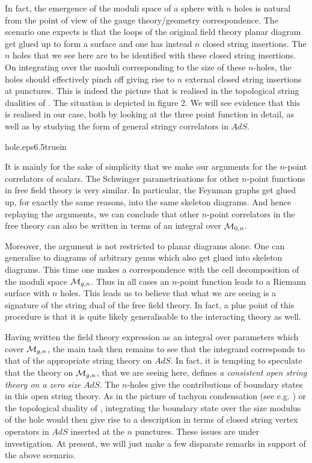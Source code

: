 In fact, the emergence of the moduli space of a sphere with $n$
holes is natural from the point of view of the gauge
theory/geometry correspondence. The scenario one expects is that
the loops of the original field theory planar diagram get glued up
to form a surface and one has instead $n$ closed string
insertions. The $n$ holes that we see here are to be identified
with these closed string insertions. On integrating over the
moduli corresponding to the size of these $n$-holes, the holes
should effectively pinch off giving rise to $n$ external closed
string insertions at punctures. This is indeed the picture that is
realised in the topological string dualities of \gv\ov\gr . The
situation is depicted in figure 2. We will see evidence that this is 
realised in our case, both by looking at the three point 
function in detail, as well as by studying the form of general 
stringy correlators in $AdS$. 


%
{hole.eps}{6.5truein}
%

It is mainly for the sake of simplicity that we make our arguments 
for the $n$-point correlators of scalars. 
The Schwinger parametrisations for other $n$-point functions in
free field theory is very similar. In particular, the Feynman
graphs get glued up, for exactly the same reasons, into the same
skeleton diagrams. And hence replaying the arguments, we
can conclude that other $n$-point correlators in the free theory
can also be written in terms of an integral over ${\cal M}_{0,n}$.

Moreover, the argument is not
restricted to planar diagrams alone. One can generalise
to diagrams of arbitrary genus which also get glued into skeleton
diagrams. This time one makes a correspondence with the cell decomposition
of the moduli space  ${\cal M}_{g,n}$. Thus in all cases an $n$-point function
leads to a Riemann surface with $n$ holes.
This leads us to believe that
what we are seeing is a signature of the string dual of the free field
theory. In fact, a plus point of this 
procedure is that it is quite likely generalisable to the 
interacting theory as well. 

Having written the field theory expression as an integral over
parameters which cover ${\cal M}_{g,n}$, the main task then
remains to see that the integrand corresponds to that of the
appropriate string theory on $AdS$. In fact, it is tempting to
speculate that the theory on ${\cal M}_{g,n}$, that we are seeing
here, defines {\it a consistent open string theory on a zero size
$AdS$}. The $n$-holes give the contributions of boundary states in
this open string theory. As in the picture of tachyon condensation
(see e.g. \grsz\gir ) or the topological duality of \gr , integrating
the boundary state over the size modulus of the hole would then
give rise to a description in terms of closed string vertex
operators in $AdS$ inserted at the $n$ punctures. These issues are
under investigation. At present, we will just make a few disparate
remarks in support of the above scenario.

